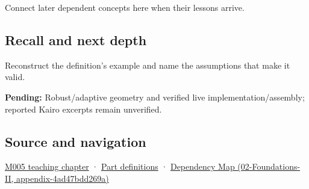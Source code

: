 Connect later dependent concepts here when their lessons arrive.

\subsection{Recall and next depth}\label{appendix-5aef4f13483a-recall-and-next-depth}

Reconstruct the definition's example and name the assumptions that make it valid.

\textbf{Pending:} Robust/adaptive geometry and verified live implementation/assembly; reported Kairo excerpts remain unverified.

\subsection{Source and navigation}\label{appendix-5aef4f13483a-source-and-navigation}

\hyperref[01-foundations-i-ch001-when-arithmetic-meets-uncertainty]{M005 teaching chapter} · \hyperref[appendix-fd090d982a15-m005---parts-77-88]{Part definitions} · \href{../02-Foundations-II/main.pdf\#nameddest=appendix-4ad47bdd269a}{Dependency Map (02-Foundations-II, appendix-4ad47bdd269a)}
